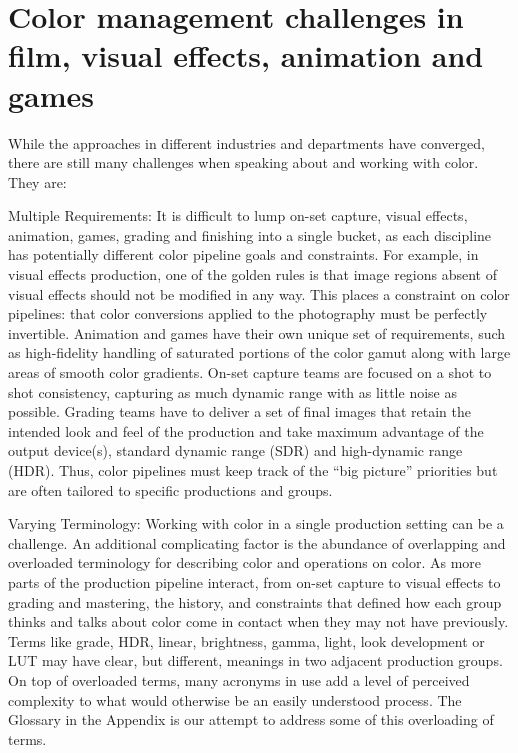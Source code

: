 \section{Color management challenges in film, visual effects, animation and games}

While the approaches in different industries and departments have converged, there are still many challenges when speaking about and working with color. They are: 
					
Multiple Requirements: It is difficult to lump on-set capture, visual effects, animation, games, grading and finishing into a single bucket, as each discipline has potentially different color pipeline goals and constraints. For example, in visual effects production, one of the golden rules is that image regions absent of visual effects should not be modified in any way. This places a constraint on color pipelines: that color conversions applied to the photography must be perfectly invertible. Animation and games have their own unique set of requirements, such as high-fidelity handling of saturated portions of the color gamut along with large areas of smooth color gradients. On-set capture teams are focused on a shot to shot consistency, capturing as much dynamic range with as little noise as possible. Grading teams have to deliver a set of final images that retain the intended look and feel of the production and take maximum advantage of the output device(s), standard dynamic range (SDR) and high-dynamic range (HDR). Thus, color pipelines must keep track of the “big picture” priorities but are often tailored to specific productions and groups.
						
Varying Terminology: Working with color in a single production setting can be a challenge. An additional complicating factor is the abundance of overlapping and overloaded terminology for describing color and operations on color. As more parts of the production pipeline interact, from on-set capture to visual effects to grading and mastering, the history, and constraints that defined how each group thinks and talks about color come in contact when they may not have previously. Terms like grade, HDR, linear, brightness, gamma, light, look development or LUT may have clear, but different, meanings in two adjacent production groups. On top of overloaded terms, many acronyms in use add a level of perceived complexity to what would otherwise be an easily understood process. The Glossary in the Appendix is our attempt to address some of this overloading of terms.


